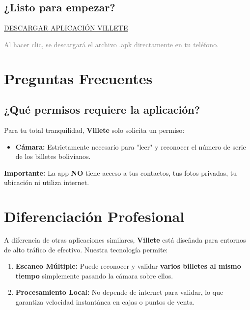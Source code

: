 \documentclass[11pt,a4paper]{article}
\begin{document}
\vspace{2cm}

\begin{center}
    \section*{¿Listo para empezar?}
    \vspace{0.5cm}
    \begin{downloadbutton}
        \href{https://github.com/ErickFP7314/ticket-validation/releases/latest/download/app-release.apk}{DESCARGAR APLICACIÓN VILLETE}
    \end{downloadbutton}
    \vspace{0.5cm}
    \textcolor{gray}{\small Al hacer clic, se descargará el archivo .apk directamente en tu teléfono.}
\end{center}

\newpage

\section*{Preguntas Frecuentes}

\subsection*{¿Qué permisos requiere la aplicación?}
Para tu total tranquilidad, \textbf{Villete} solo solicita un permiso:
\begin{itemize}
    \item \textbf{Cámara:} Estrictamente necesario para "leer" y reconocer el número de serie de los billetes bolivianos.
\end{itemize}
\textbf{Importante:} La app \textbf{NO} tiene acceso a tus contactos, tus fotos privadas, tu ubicación ni utiliza internet.

\section*{Diferenciación Profesional}
A diferencia de otras aplicaciones similares, \textbf{Villete} está diseñada para entornos de alto tráfico de efectivo. Nuestra tecnología permite:
\begin{enumerate}
    \item \textbf{Escaneo Múltiple:} Puede reconocer y validar \textbf{varios billetes al mismo tiempo} simplemente pasando la cámara sobre ellos.
    \item \textbf{Procesamiento Local:} No depende de internet para validar, lo que garantiza velocidad instantánea en cajas o puntos de venta.
\end{enumerate}
\end{document}
